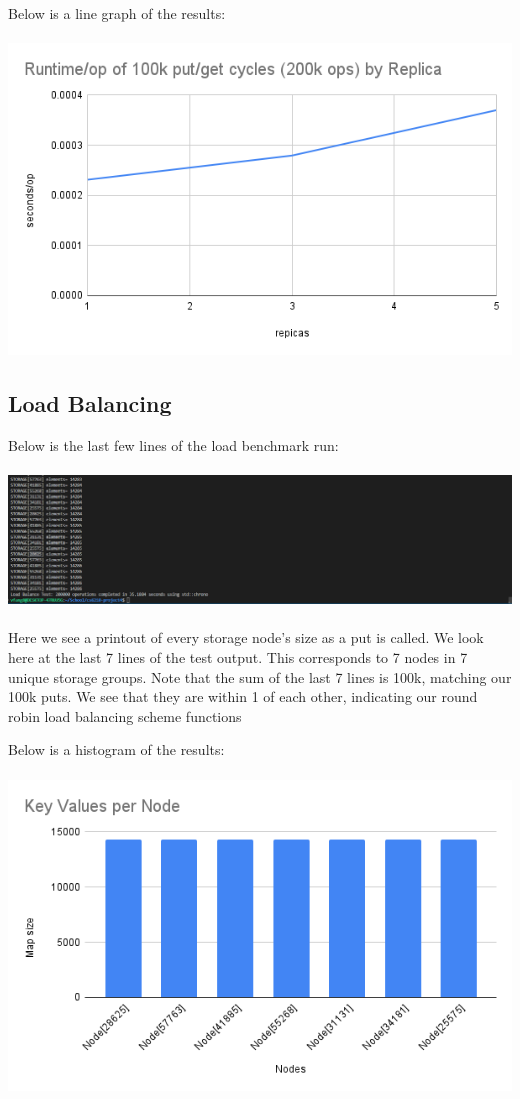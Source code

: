 \documentclass{article}
\begin{document}
\pagebreak
Below is a line graph of the results:\\\\
\includegraphics[width=\linewidth]{img/PerformanceChart.png} 

\pagebreak
\subsection{Load Balancing}
Below is the last few lines of the load benchmark run:\\\\
\includegraphics[width=\linewidth]{img/load71.png}\\\\

Here we see a printout of every storage node's size as a put is called. We look here at the last 7 lines of the test output. This corresponds to 7 nodes in 7 unique
storage groups. Note that the sum of the last 7 lines is 100k, matching our 100k puts. We see that they are within 1 of each other, 
indicating our round robin load balancing scheme functions

Below is a histogram of the results:\\\\
\includegraphics[width=\linewidth]{img/LoadChart.png} 
\end{document}
